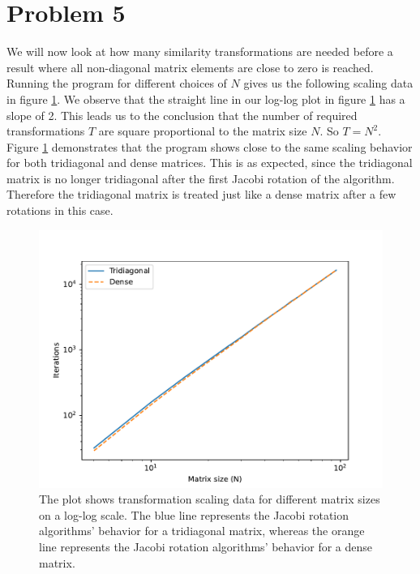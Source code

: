 \documentclass[english,notitlepage]{revtex4-1}  %
\begin{document}
\section*{Problem 5}
We will now look at how many similarity transformations are needed 
before a result where all non-diagonal matrix elements 
are close to zero is reached. \\

Running the program for different choices of $N$
gives us the following scaling data in figure \ref{fig:N_iter_log_both}.
We observe that the straight line in our log-log plot in figure \ref{fig:N_iter_log_both} 
has a slope of 2. This leads us to the conclusion that the number of required transformations $T$ are 
square proportional to the matrix size $N$. So $T = N^2$. \\

Figure \ref{fig:N_iter_log_both} demonstrates that the program shows close to
the same scaling behavior for both tridiagonal and dense matrices. 
This is as expected, since the tridiagonal matrix is 
no longer tridiagonal after the first Jacobi rotation of the algorithm. 
Therefore the tridiagonal matrix is treated just like a dense matrix after a few
rotations in this case.

\begin{figure}[H]
    \centering
    \includegraphics[width=1.\textwidth]{../figures/N_iter_log_both.pdf}
    \caption{The plot shows transformation scaling data for different matrix sizes on a log-log scale. 
    The blue line represents the Jacobi rotation algorithms' behavior for a tridiagonal matrix, 
    whereas the orange line represents the Jacobi rotation algorithms' behavior for a dense matrix.}
    \label{fig:N_iter_log_both}
\end{figure}
\end{document}
